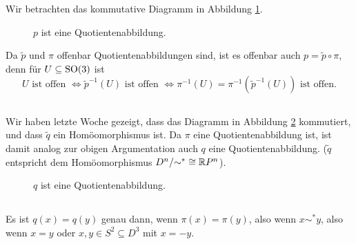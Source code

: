 \documentclass[a4paper,10pt]{article}
\begin{document}
Wir betrachten das kommutative Diagramm in Abbildung \ref{fig: p Quotientenabbildung}.
\begin{figure}\centering
 \caption{$p$ ist eine Quotientenabbildung.}
 \label{fig: p Quotientenabbildung}
\end{figure}
Da $\tilde{p}$ und $\pi$ offenbar Quotientenabbildungen sind, ist es offenbar auch $p = \tilde{p} \circ \pi$, denn für $U \subseteq \operatorname{SO}(3)$ ist
\[
 U \text{ ist offen }
 \Leftrightarrow \tilde{p}^{-1}(U) \text{ ist offen }
 \Leftrightarrow \pi^{-1}(U) = \pi^{-1}\left(\tilde{p}^{-1}(U)\right) \text{ ist offen}.
\]


\subsection{}
Wir haben letzte Woche gezeigt, dass das Diagramm in Abbildung \ref{fig: q Quotientenabbildung} kommutiert, und dass $\tilde{q}$ ein Homöomorphismus ist. Da $\pi$ eine Quotientenabbildung ist, ist damit analog zur obigen Argumentation auch $q$ eine Quotientenabbildung. ($\tilde{q}$ entspricht dem Homöomorphismus $D^n/{\sim^*} \cong \mathbb{R} P^n$).
\begin{figure}\centering
 \caption{$q$ ist eine Quotientenabbildung.}
 \label{fig: q Quotientenabbildung}
\end{figure}


\subsection{}
Es ist $q(x) = q(y)$ genau dann, wenn $\pi(x) = \pi(y)$, also wenn $x \sim^* y$, also wenn $x = y$ oder $x,y \in S^2 \subseteq D^3$ mit $x = -y$.
\end{document}

